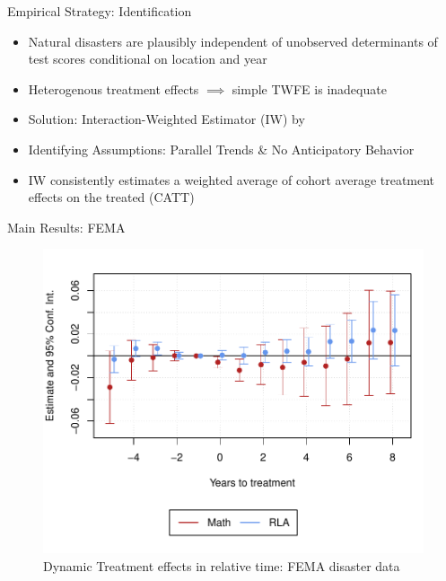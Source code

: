 \documentclass[hyperref={colorlinks = true,linkcolor = blue, citecolor=blue,urlcolor=blue}]{beamer}
\begin{document}
\begin{frame}{Empirical Strategy: Identification}
	\begin{itemize}
		\item Natural disasters are plausibly independent of unobserved determinants of test scores conditional on location and year
		\item Heterogenous treatment effects $\implies$ simple TWFE is inadequate \citep{deChaisemartin_2020, Sun_2021}
		\item Solution: Interaction-Weighted Estimator (IW) by \cite{Sun_2021}
		\item Identifying Assumptions: Parallel Trends \& No Anticipatory Behavior
		\item IW consistently estimates a weighted average of cohort average treatment effects on the treated (CATT)
	\end{itemize}
\end{frame}

\begin{frame}{Main Results: FEMA}
	\begin{figure}[!h]
		\centering
		\includegraphics[scale=0.6]{"../Code & Data/ResultsPlotPresentation.pdf"}
		\caption{Dynamic Treatment effects in relative time: FEMA disaster data}
	\end{figure}
\end{frame}
\end{document}
